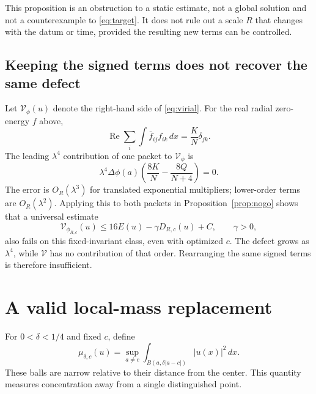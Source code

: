 \documentclass[11pt,a4paper]{article}
\theoremstyle{remark}\newtheorem{remark}[theorem]{Remark}
\newcommand{\dd}{\,dx}
\DeclareMathOperator{\Rea}{Re}
\begin{document}
This proposition is an obstruction to a static estimate, not a global solution and not a counterexample to \eqref{eq:target}. It does not rule out a scale $R$ that changes with the datum or time, provided the resulting new terms can be controlled.

\subsection{Keeping the signed terms does not recover the same defect}
Let $\mathcal V_\phi(u)$ denote the right-hand side of \eqref{eq:virial}. For the real radial zero-energy $f$ above,
\[
 \Rea\sum_i\int\bar f_{ij}f_{ik}\dd=\frac KN\delta_{jk}.
\]
The leading $\lambda^4$ contribution of one packet to $\mathcal V_\phi$ is
\[
 \lambda^4\Delta\phi(a)\left(\frac{8K}{N}-\frac{8Q}{N+4}\right)=0.
\]
The error is $O_R(\lambda^3)$ for translated exponential multipliers; lower-order terms are $O_R(\lambda^2)$. Applying this to both packets in Proposition~\ref{prop:nogo} shows that a universal estimate
\[
 \mathcal V_{\phi_{R,c}}(u)\le16E(u)-\gamma D_{R,c}(u)+C,\qquad\gamma>0,
\]
also fails on this fixed-invariant class, even with optimized $c$. The defect grows as $\lambda^4$, while $\mathcal V$ has no contribution of that order. Rearranging the same signed terms is therefore insufficient.

\section{A valid local-mass replacement}
For $0<\delta<1/4$ and fixed $c$, define
\begin{equation}\label{eq:mu}
 \mu_{\delta,c}(u)=\sup_{a\ne c}\int_{B(a,\delta|a-c|)}|u(x)|^2\dd.
\end{equation}
These balls are narrow relative to their distance from the center. This quantity measures concentration away from a single distinguished point.
\end{document}
